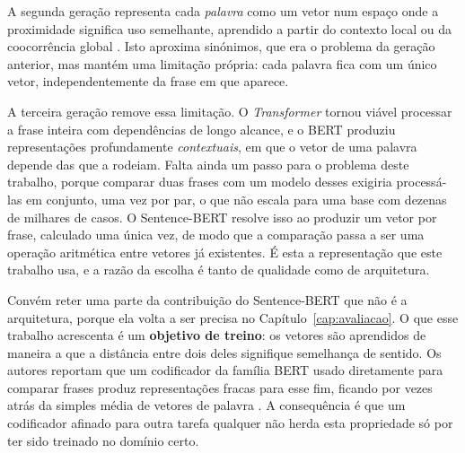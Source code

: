 A segunda geração representa cada \emph{palavra} como um vetor num espaço onde a proximidade
significa uso semelhante, aprendido a partir do contexto local \autocite{mikolov2013word2vec} ou da
coocorrência global \autocite{pennington2014glove}. Isto aproxima sinónimos, que era o problema da
geração anterior, mas mantém uma limitação própria: cada palavra fica com um único vetor,
independentemente da frase em que aparece.

A terceira geração remove essa limitação. O \emph{Transformer} \autocite{vaswani2017attention} tornou
viável processar a frase inteira com dependências de longo alcance, e o BERT
\autocite{devlin2019bert} produziu representações profundamente \emph{contextuais}, em que o vetor de
uma palavra depende das que a rodeiam. Falta ainda um passo para o problema deste trabalho, porque
comparar duas frases com um modelo desses exigiria processá-las em conjunto, uma vez por par, o que
não escala para uma base com dezenas de milhares de casos. O Sentence-BERT \autocite{reimers2019sbert}
resolve isso ao produzir um vetor por frase, calculado uma única vez, de modo que a comparação passa
a ser uma operação aritmética entre vetores já existentes. É esta a representação que este trabalho
usa, e a razão da escolha é tanto de qualidade como de arquitetura.

Convém reter uma parte da contribuição do Sentence-BERT que não é a arquitetura, porque ela volta a
ser precisa no Capítulo~\ref{cap:avaliacao}. O que esse trabalho acrescenta é um \textbf{objetivo de
treino}: os vetores são aprendidos de maneira a que a distância entre dois deles signifique
semelhança de sentido. Os autores reportam que um codificador da família BERT usado diretamente para
comparar frases produz representações fracas para esse fim, ficando por vezes atrás da simples média
de vetores de palavra \autocite{reimers2019sbert}. A consequência é que um codificador afinado para
outra tarefa qualquer não herda esta propriedade só por ter sido treinado no domínio certo.

